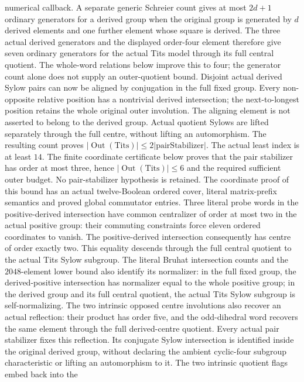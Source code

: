numerical callback.
A separate generic Schreier count gives at most $2d+1$ ordinary
generators for a derived group when the original group is generated
by $d$ derived elements and one further element whose square is
derived. The three actual derived generators and the displayed
order-four element therefore give seven ordinary generators for the
actual Tits model through its full central quotient. The whole-word
relations below improve this to four; the generator count alone does
not supply an outer-quotient bound.
Disjoint actual derived Sylow pairs can now be aligned by conjugation
in the full fixed group. Every non-opposite relative position has a
nontrivial derived intersection; the next-to-longest position retains
the whole original outer involution. The aligning element is not
asserted to belong to the derived group. Actual quotient Sylows are
lifted separately through the full centre, without lifting an automorphism.
The resulting count proves
$|\operatorname{Out}(\mathrm{Tits})|\leq2|\mathrm{pairStabilizer}|$.
The actual least index is at least $14$. The finite coordinate
certificate below proves that the pair stabilizer has order at most
three, hence $|\operatorname{Out}(\mathrm{Tits})|\leq6$ and the required
sufficient outer budget. No pair-stabilizer hypothesis is retained.
The coordinate proof of this bound has an actual twelve-Boolean
ordered cover, literal matrix-prefix semantics and proved global
commutator entries. Three literal probe words in the positive-derived
intersection have common centralizer of order at most two in the actual
positive group: their commuting constraints force eleven ordered
coordinates to vanish. The positive-derived intersection consequently
has centre of order exactly two. This equality descends through the
full central quotient to the actual Tits Sylow subgroup. The
literal Bruhat intersection counts and the $2048$-element lower bound
also identify its normalizer: in the full fixed group, the
derived-positive intersection has normalizer equal to the whole
positive group; in the derived group and its full central quotient,
the actual Tits Sylow subgroup is self-normalizing. The two intrinsic
opposed centre involutions also recover an actual reflection: their
product has order five, and the odd-dihedral word recovers the same
element through the full derived-centre quotient. Every actual pair
stabilizer fixes this reflection. Its conjugate Sylow intersection is
identified inside the original derived group, without declaring the
ambient cyclic-four subgroup characteristic or lifting an automorphism
to it. The two intrinsic quotient flags embed back into the
